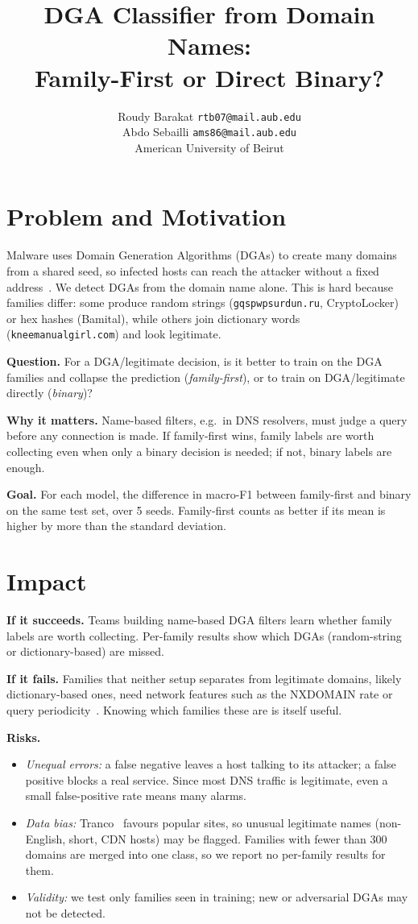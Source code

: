 \documentclass[11pt]{article}
\title{\vspace{-2.2em}\textbf{DGA Classifier from Domain Names:\\Family-First or Direct Binary?}}
\author{
  Roudy Barakat \quad \texttt{rtb07@mail.aub.edu} \\
  Abdo Sebailli \quad \texttt{ams86@mail.aub.edu} \\[0.3em]
  \small American University of Beirut
}
\date{\vspace{-1.5em}}
\begin{document}
\maketitle

\section{Problem and Motivation}
Malware uses Domain Generation Algorithms (DGAs) to create many domains from a
shared seed, so infected hosts can reach the attacker without a fixed
address~\cite{plohmann2016dgarchive}. We detect DGAs from the domain name alone.
This is hard because families differ: some produce random strings
(\texttt{gqspwpsurdun.ru}, CryptoLocker) or hex hashes (Bamital), while others join
dictionary words (\texttt{kneemanualgirl.com}) and look legitimate.

\textbf{Question.} For a DGA/legitimate decision, is it better to train on the
DGA families and collapse the prediction (\emph{family-first}), or to train on
DGA/legitimate directly (\emph{binary})?

\textbf{Why it matters.} Name-based filters, e.g.\ in DNS resolvers, must judge a
query before any connection is made. If family-first wins, family labels are
worth collecting even when only a binary decision is needed; if not, binary
labels are enough.

\textbf{Goal.} For each model, the difference in macro-F1 between family-first
and binary on the same test set, over 5 seeds. Family-first counts as better if
its mean is higher by more than the standard deviation.

\section{Impact}
\textbf{If it succeeds.} Teams building name-based DGA filters learn whether
family labels are worth collecting. Per-family results show which DGAs
(random-string or dictionary-based) are missed.

\textbf{If it fails.} Families that neither setup separates from legitimate
domains, likely dictionary-based ones, need network features such as the
NXDOMAIN rate or query periodicity~\cite{antonakakis2012pleiades}. Knowing
which families these are is itself useful.

\textbf{Risks.}
\begin{itemize}
  \item \emph{Unequal errors:} a false negative leaves a host talking to its
  attacker; a false positive blocks a real service. Since most DNS traffic is
  legitimate, even a small false-positive rate means many alarms.
  \item \emph{Data bias:} Tranco~\cite{lepochat2019tranco} favours popular
  sites, so unusual legitimate names (non-English, short, CDN hosts) may be
  flagged. Families with fewer than 300 domains are merged into one class, so we
  report no per-family results for them.
  \item \emph{Validity:} we test only families seen in training; new or
  adversarial DGAs may not be detected.
\end{itemize}
\end{document}
